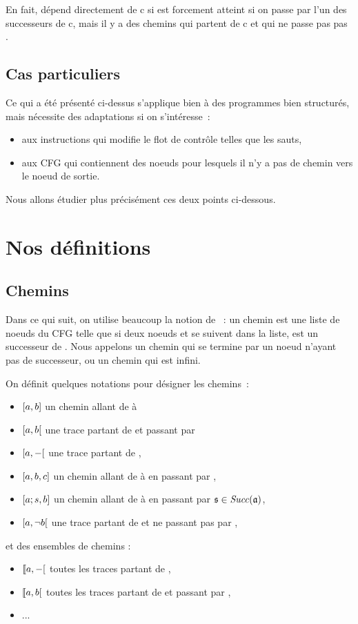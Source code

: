 En fait,  dépend directement de c si
 est forcement atteint si on passe par l'un des successeurs de c,
mais il y a des chemins qui partent de c et qui ne passe pas pas .

\subsection{Cas particuliers}

Ce qui a été présenté ci-dessus s'applique bien à des programmes bien
structurés, mais nécessite des adaptations si on s'intéresse~:

\begin{itemize}
  \item aux instructions qui modifie le flot de contrôle telles que les sauts,
  \item aux CFG qui contiennent des noeuds pour lesquels il n'y a pas de chemin
    vers le noeud de sortie.
\end{itemize}

Nous allons étudier plus précisément ces deux points ci-dessous.

\section{Nos définitions}

\subsection{Chemins}

Dans ce qui suit, on utilise beaucoup la notion de ~:
un chemin est une liste de noeuds du CFG telle que si deux noeuds  et 
se suivent dans la liste,  est un successeur de .
Nous appelons  un chemin qui se termine par un noeud
n'ayant pas de successeur, ou un chemin qui est infini.

On définit quelques notations pour désigner les chemins~:
\begin{itemize}
  \item $[a, b]$  un chemin allant de  à 
  \item $[a, b[$ une trace partant de  et passant par 
  \item $[a, -[$ une trace partant de ,
  \item $[a, b, c]$ un chemin allant de  à  en passant par ,
  \item $[a;s, b]$
    un chemin allant de  à  en passant par $\mathfrak{s} \in \mathit{Succ}(\mathfrak{a})$,
  \item $[a, \neg b[$
    une trace partant de  et ne passant pas par ,
\end{itemize}
et des ensembles de chemins :
\begin{itemize}
  \item $\llbracket a, -[$ toutes les traces partant de ,
  \item $\llbracket a, b[$ toutes les traces partant de  et passant
    par ,
  \item ...
\end{itemize}

